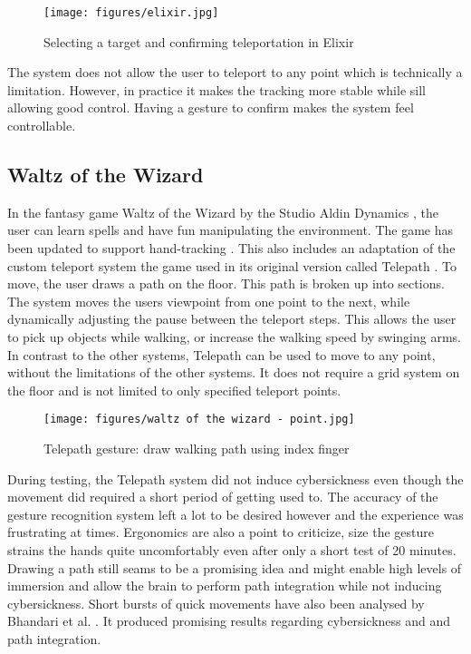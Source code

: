 \begin{figure}[hbt!]
  \centering
  \texttt{[image: figures/elixir.jpg]}
  \caption{Selecting a target and confirming teleportation in Elixir}
  \label{fig:elixir}
\end{figure}

The system does not allow the user to teleport to any point which is technically a limitation. However, in practice it makes the tracking more stable while sill allowing good control. Having a gesture to confirm makes the system feel controllable. 


\subsection{Waltz of the Wizard}
In the fantasy game Waltz of the Wizard \cite{WaWizOculus} by the Studio Aldin Dynamics \cite{Aladin}, the user can learn spells and have fun manipulating the environment. The game has been updated to support hand-tracking \cite{WaWizBlog}. This also includes an adaptation of the custom teleport system the game used in its original version called Telepath \cite{WaWizTelePath}. To move, the user draws a path on the floor. This path is broken up into sections. The system moves the users viewpoint from one point to the next, while dynamically adjusting the pause between the teleport steps. This allows the user to pick up objects while walking, or increase the walking speed by swinging arms. In contrast to the other systems, Telepath can be used to move to any point, without the limitations of the other systems. It does not require a grid system on the floor and is not limited to only specified teleport points.

\begin{figure}[hbt!]
  \centering
  \texttt{[image: figures/waltz of the wizard - point.jpg]}
  \caption{Telepath gesture: draw walking path using index finger}
  \label{fig:telepath}
\end{figure}

During testing, the Telepath system did not induce cybersickness even though the movement did required a short period of getting used to. The accuracy of the gesture recognition system left a lot to be desired however and the experience was frustrating at times. Ergonomics are also a point to criticize, size the gesture strains the hands quite uncomfortably even after only a short test of 20 minutes. Drawing a path still seams to be a promising idea and might enable high levels of immersion and allow the brain to perform path integration while not inducing cybersickness. Short bursts of quick movements have also been analysed by Bhandari et al. \cite{Bhandari}. It produced promising results regarding cybersickness and and path integration. 

